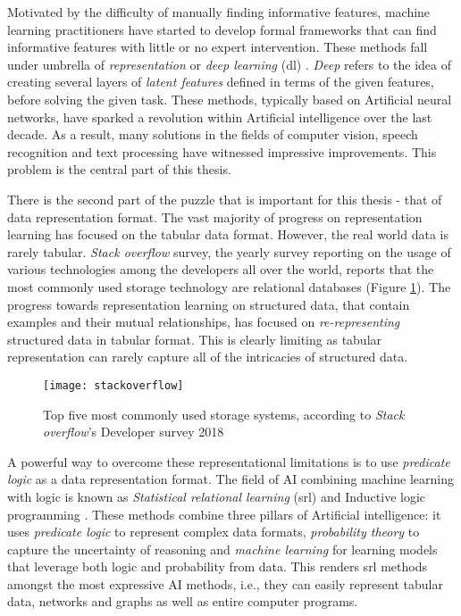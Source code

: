 Motivated by the difficulty of manually finding informative features, machine learning practitioners have started to develop formal frameworks that can find informative features with little or no expert intervention.
These methods fall under umbrella of \textit{representation} or \textit{deep learning} (\gls{dl}) \cite{Goodfellow2016, Bengio:2009}.
\textit{Deep} refers to the idea of creating several layers of \textit{latent features} defined in terms of the given features, before solving the given task.
These methods, typically based on Artificial neural networks, have sparked a revolution within Artificial intelligence over the last decade.
As a result, many solutions in the fields of computer vision, speech recognition and text processing have witnessed impressive improvements.
This problem is the central part of this thesis.



There is the second part of the puzzle that is important for this thesis - that of data representation format.
The vast majority of progress on representation learning has focused on the tabular data format.
However, the real world data is rarely tabular.
\textit{Stack overflow} survey, the yearly survey reporting on the usage of  various technologies among the developers all over the world, reports that the most commonly used storage technology are relational databases (Figure \ref{fig:stackoverflow}).
The progress towards representation learning on structured data, that contain examples and their mutual relationships, has focused on \textit{re-representing} structured data in tabular format.
This is clearly limiting as tabular representation can rarely capture all of the intricacies of structured data.


\begin{figure}
	\medskip
	\centering
	\texttt{[image: stackoverflow]}
	\caption[Usage of the storage technologies]{Top five most commonly used storage systems, according to \textit{Stack overflow}'s Developer survey 2018\label{fig:stackoverflow}}
\end{figure}


A powerful way to overcome these representational limitations is to use \textit{predicate logic} as a data representation format.
The field of AI combining machine learning with logic is known as \textit{Statistical relational learning} (\gls{srl}) \cite{GetoorSRL,Raedt:2016:SRA:3027718} and Inductive logic programming \cite{LucRLbook}.
These methods combine three pillars of Artificial intelligence: it uses \textit{predicate logic} to represent complex data formats, \textit{probability theory} to capture the uncertainty of reasoning and \textit{machine learning} for learning models that leverage both logic and probability from data.
This renders \gls{srl} methods amongst the most expressive AI methods, i.e., they can easily represent tabular data, networks and graphs as well as entire computer programs.



